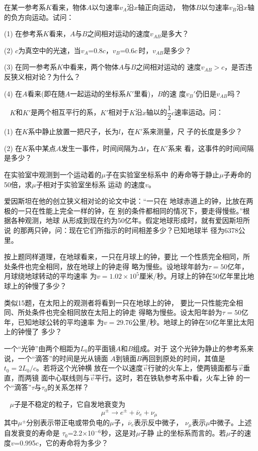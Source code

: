 \begin{exercises}
\exercise 在某一参考系$K$看来，物体$A$以匀速率$v_A$沿$x$轴正向运动，
物体$B$以匀速率$v_B$沿$x$轴的负方向运动。试问：

(1) 在参考系$K$看来，\!$A$与$B$之间相对运动的速度$v_{A\!B}$是多大？

(2) $c$为真空中的光速，当$ v _ { A }$=0.8$ c $，\!$ v _ { B }$=0.6$ c $\,时，\!$v_{A\!B}$是多少？

(3) 在同一参考系$K$中看来，两个物体$A$与$B$之间相对运动的
速度$ v _ { A B } > c $，是否违反狭义相对论？为什么？

(4) 在$A$看来(即在随$A$一起运动的坐标系$K'$里看)，$B$的速
度$ v _ B ' $仍旧是$v_{AB}$吗？

\exercise~ $K$和$K'$是两个相互平行的系，$K'$相对于$K$沿$x$轴以的$\dfrac { 1 } { 2 } c $速率运动。问：

(1) 在$K$系中静止放置一把尺子，长为$l$，在$K'$系来测量，尺
子的长度是多少？

(2) 在$K$系中某点$A$发生一事件，时间间隔为$\Delta t$，在$K'$系来
看，这事件的时间间隔是多少？

\exercise 在实验室中观测到一个运动着的$\mu$子在实验室坐标系中
的寿命等于静止$\mu$子寿命的50倍，求$\mu$子相对于实验室坐标系
运动
的速度$v$。

\clearpage
\exercise 爱因斯坦在他的创立狭义相对论的论文中说：“一只在
地球赤道上的钟，比放在两极的一只在性能上完全一样的钟，在
别的条件都相同的情况下，要走得慢些。”根据各种观测，地球
从形成到现在约为50亿年。假定地球形成时，就有爱因斯坦所说
的那两只钟，问：现在它们所指示的时间相差多少？已知地球半
径为6378公里。

\exercise 按上题同样道理，在地球看来，一只在月球上的钟，要比
一个性质完全相同，所处条件也完全相同，放在地球上的钟走得
略为慢些。设地球年龄为$ \tau = 5 0 $亿年，月球绕地球转动的平均速率
为$ v = 1 . 0 2 \times 1 0 ^ { 5 } $厘米/秒。月球上的钟在50亿年里比地球上的钟慢了多少？

\exercise 类似15题，在太阳上的观测者将看到一只在地球上的钟，
要比一只性能完全相同、所处条件也完全相同放在太阳上的钟走
得略为慢些。设太阳年龄为$ \tau = 5 0 $亿年，已知地球公转的平均速率
为$ v = 2 9 . 7 6 $公里/秒。地球上的钟在50亿年里比太阳上的钟慢了
多少？

\exercise 一个“光钟”由两个相距为$ L _ { 0 } $的平面镜$A$和$B$组成。对于
这个光钟为静止的参考系来说，一个“滴答”的时间是光从镜面
$A$到镜面$B$再回到原处的时间，其值是$ t _ { 0 } = 2 L _ { 0 } /c$。若将这个光钟横
放在一个以速度$\vec{v}$行驶的火车上，使两镜面都与$\vec{v}$垂直，而两镜
面中心联线则与$\vec{v}$平行。这时，若在铁轨参考系中看，火车上钟
的一个“滴答”$\tau$与$\tau _ 0$的关系怎样？

\exercise ~ $\mu$子是不稳定的粒子，它自发地衰变为
\begin{equation*}
  \mu ^ \pm \longrightarrow e ^ \pm + \overline{\nu} _ { e } + \nu _ { \mu }
\end{equation*}
其中$\mu ^ \pm$分别表示带正电或带负电的$\mu$子，$\overline{\nu} _ { e }$表示反中微子，
$\nu _ { \mu}$表示$\mu$中微子。上述自发衰变的寿命是
$ \tau _ { 0 }$=2.2$\times$10$^{-6}$秒，这是对$\mu$子静
止的坐标系而言的。若$\mu$子的速度$ v$=0.995$c$，它的寿命将为多少？
\end{exercises}
